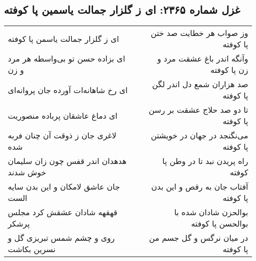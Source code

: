 \begin{center}
\section*{غزل شماره ۲۳۶۵: ای ز گلزار جمالت یاسمین پا کوفته}
\label{sec:2365}
\begin{longtable}{l p{0.5cm} r}
ای ز گلزار جمالت یاسمن پا کوفته
&&
وز صواب هر خطایت صد ختن پا کوفته
\\
ای بزاده حسن تو بی‌واسطه هر مرد و زن
&&
وآنگه اندر باغ عشقت مرد و زن پا کوفته
\\
ای رخ شاهانه‌ات آورده جان پروانه‌ای
&&
صد هزاران شمع دل اندر لگن پا کوفته
\\
ای دماغ عاشقان پرباده منصوریت
&&
تا دو صد حلاج عشقت بر رسن پا کوفته
\\
لاغری جان ز ذوقت آن چنان فربه شده
&&
می‌نگنجد در جهان در خویشتن پا کوفته
\\
هدهدان اندر قفس چون زان سلیمان خوش شدند
&&
راه پریدن نبد تا در وطن پا کوفته
\\
جان عاشق لامکان و این بدن سایه الست
&&
آفتاب جان به رقص و این بدن پا کوفته
\\
قهقهه شادان عشقش کرد مجلس پرشکر
&&
بوالحزن شادان شده با بوالحسن پا کوفته
\\
روی و چشم شمس تبریزی گل و نسرین بکاشت
&&
در میان نرگس و گل جسم من پا کوفته
\\
\end{longtable}
\end{center}
